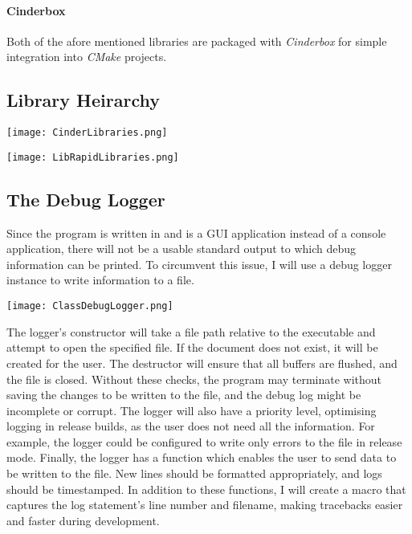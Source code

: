 \paragraph{Cinderbox} Both of the afore mentioned libraries are packaged with \textit{Cinderbox} for simple integration into \textit{CMake} projects.

\subsection{Library Heirarchy}

\FloatBarrier
\begin{figure*}[htp]
    \centering
    \texttt{[image: CinderLibraries.png]}
\end{figure*}
\FloatBarrier

\FloatBarrier
\begin{figure*}[htp]
    \centering
    \texttt{[image: LibRapidLibraries.png]}
\end{figure*}
\FloatBarrier

\subsection{The Debug Logger}

Since the program is written in \CPP and is a GUI application instead of a console application, there will not be a usable standard output to which debug information can be printed. To circumvent this issue, I will use a debug logger instance to write information to a file.

\FloatBarrier
\begin{figure*}[htp]
    \centering
    \texttt{[image: ClassDebugLogger.png]}
\end{figure*}
\FloatBarrier

The logger's constructor will take a file path relative to the executable and attempt to open the specified file. If the document does not exist, it will be created for the user. The destructor will ensure that all buffers are flushed, and the file is closed. Without these checks, the program may terminate without saving the changes to be written to the file, and the debug log might be incomplete or corrupt. The logger will also have a priority level, optimising logging in release builds, as the user does not need all the information. For example, the logger could be configured to write only errors to the file in release mode. Finally, the logger has a function which enables the user to send data to be written to the file. New lines should be formatted appropriately, and logs should be timestamped. In addition to these functions, I will create a macro that captures the log statement's line number and filename, making tracebacks easier and faster during development.

